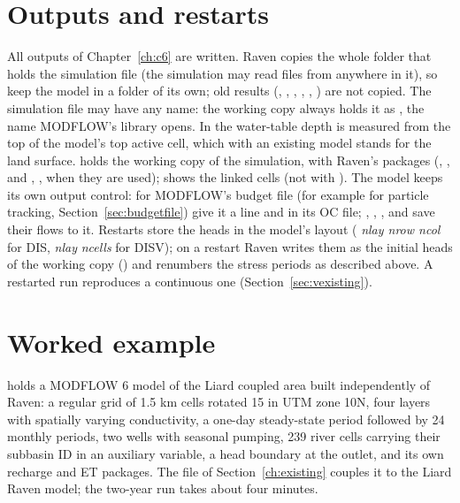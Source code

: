 \section{Outputs and restarts}
All outputs of Chapter~\ref{ch:c6} are written. Raven copies the whole folder that holds the simulation file (the simulation
may read files from anywhere in it), so keep the model in a folder of its own; old results (, ,
, , , ) are not copied. The simulation file may have any name: the working copy
always holds it as , the name MODFLOW's library opens. In  the water-table depth is
measured from the top of the model's top active cell, which with an existing model stands for the land surface.  holds the working copy of the simulation, with Raven's packages
(, , and , ,  when they are used);
 shows the linked cells (not with ). The model keeps its own output
control: for MODFLOW's budget file (for example for particle tracking, Section~\ref{sec:budgetfile}) give it a
 line and  in its OC file; , , ,  and  save their flows to it.
Restarts store the heads in the model's layout ( \emph{nlay nrow ncol} for DIS, \emph{nlay}  \emph{ncells}
for DISV); on a restart Raven writes them as the initial heads of the working copy () and renumbers the stress
periods as described above. A restarted run reproduces a continuous one (Section~\ref{sec:vexisting}).

\section{Worked example}
 holds a MODFLOW 6 model of the Liard coupled area built independently of Raven: a
regular grid of 1.5 km cells rotated 15\textdegree{} in UTM zone 10N, four layers with spatially varying conductivity,
a one-day steady-state period followed by 24 monthly periods, two wells with seasonal pumping, 239 river cells carrying
their subbasin ID in an auxiliary variable, a head boundary at the outlet, and its own recharge and ET packages. The 
file of Section~\ref{ch:existing} couples it to the Liard Raven model; the two-year run takes about four minutes.

